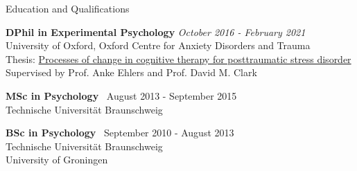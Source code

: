 \documentclass{resume} %
\begin{document}



\begin{rSection}{Education and Qualifications}

{\bf DPhil in Experimental Psychology} \hfill {\em October 2016 - February 2021} \\ 
University of Oxford, Oxford Centre for Anxiety Disorders and Trauma \smallskip \\
Thesis: \href{https://ora.ox.ac.uk/objects/uuid:96ac1526-0405-4147-b071-2b3bb0e24802}{Processes of change in cognitive therapy for posttraumatic stress disorder}  \\
Supervised by Prof. Anke Ehlers and Prof. David M. Clark \smallskip

{\bf MSc in Psychology} \hfill {\ August 2013 - September 2015} \\ 
Technische Universit{\"a}t Braunschweig \smallskip

{\bf BSc in Psychology} \hfill {\ September 2010 - August 2013} \\ 
Technische Universit{\"a}t Braunschweig \\
University of Groningen \smallskip

\end{rSection}
\end{document}
